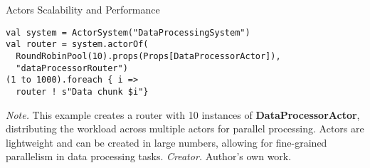 \begin{table}[H]
\caption{Actors Scalability and Performance}
\begin{lstlisting}
val system = ActorSystem("DataProcessingSystem")
val router = system.actorOf(
  RoundRobinPool(10).props(Props[DataProcessorActor]),
  "dataProcessorRouter")
(1 to 1000).foreach { i =>
  router ! s"Data chunk $i"}
\end{lstlisting}
\small
\textit{Note.} This example creates a router with 10 instances of \textbf{DataProcessorActor}, distributing the workload across multiple actors for parallel processing. Actors are lightweight and can be created in large numbers, allowing for fine-grained parallelism in data processing tasks.
\textit{Creator.} Author's own work.
\end{table}